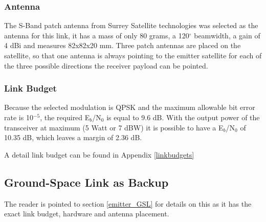 \subsubsection{Antenna}
The S-Band patch antenna from Surrey Satellite technologies \cite{SurrPatch} was selected as the antenna for this link, it has a mass of only 80 grams, a 120$^{\circ}$ beamwidth, a gain of 4 dBi and measures 82x82x20 mm. Three patch antennas are placed on the satellite, so that one antenna is always pointing to the emitter satellite for each of the three possible directions the receiver payload can be pointed.

\subsubsection{Link Budget}
Because the selected modulation is QPSK and the maximum allowable bit error rate is 10$^{-5}$, the required E$_{b}$/N$_{0}$ is equal to 9.6 dB. With the output power of the transceiver at maximum (5 Watt or 7 dBW) it is possible to have a E$_{b}$/N$_{0}$ of 10.35 dB, which leaves a margin of 2.36 dB.

A detail link budget can be found in Appendix \ref{linkbudgets}

\subsection{Ground-Space Link as Backup}
The reader is pointed to section \ref{emitter_GSL} for details on this as it has the exact link budget, hardware and antenna placement. 


